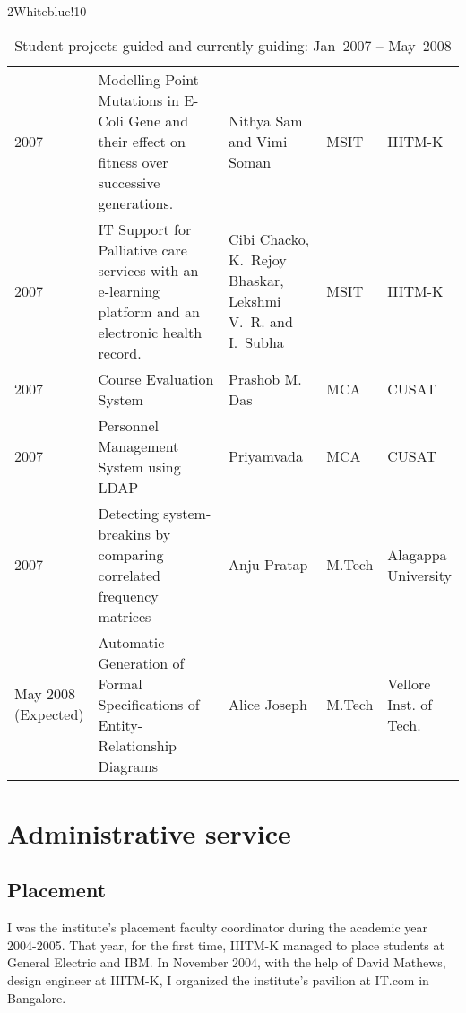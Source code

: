 \documentclass[titlepage, %
11pt, 
]{article}
\begin{document}
\begin{table}
\rowcolors%
{2}{White}{blue!10}
\setlength\extrarowheight{4pt}
\begin{tabular}%
{|p{0.10\linewidth}|p{0.40\linewidth}|p{0.25\linewidth}|p{0.10\linewidth}|p{0.15\linewidth}|}
\hline
\multicolumn{1}{|m{0.10\linewidth}|}{\centering {\bf Year}}&
\multicolumn{1}{m{0.40\linewidth}|}{\centering {\bf Project Title}}&
\multicolumn{1}{m{0.25\linewidth}|}{\centering {\bf Student}}&
\multicolumn{1}{m{0.10\linewidth}|}{\centering {\bf Degree}}&
\multicolumn{1}{m{0.15\linewidth}|}{\centering {\bf Univ.}}\\
\hline
2007 & Modelling Point Mutations in E-Coli Gene and their effect on
fitness over successive generations. & Nithya Sam and Vimi Soman & MSIT & IIITM-K\\
2007 & IT Support for Palliative care services with an
e-learning platform and an electronic health record. & Cibi Chacko,  K.~Rejoy Bhaskar,  Lekshmi V.~R. and I.~Subha & MSIT & IIITM-K\\
2007 & Course Evaluation System & Prashob M. Das & MCA & CUSAT\\
2007 & Personnel Management System using LDAP & Priyamvada & MCA & CUSAT\\
2007 & Detecting system-breakins by comparing correlated frequency matrices & Anju Pratap & M.Tech & Alagappa University\\
May 2008 (Expected) & Automatic Generation of Formal Specifications of  Entity-Relationship Diagrams & Alice Joseph & M.Tech & Vellore Inst. of Tech.\\
\hline
\end{tabular}
\caption{Student projects guided and currently guiding: Jan~2007 -- May~2008 \label{tbl:ms-projects-2}}
\end{table}


\section{Administrative service}
\label{sec:admin}

\subsection{Placement}
\label{subsec:placement}
I was the institute's placement faculty coordinator during
the academic year 2004-2005.  That year, for the first time,
IIITM-K managed to place students at General Electric and
IBM.  In November 2004, with the help of David Mathews,
design engineer at IIITM-K, I organized the institute's
pavilion at IT.com in Bangalore.
\end{document}
